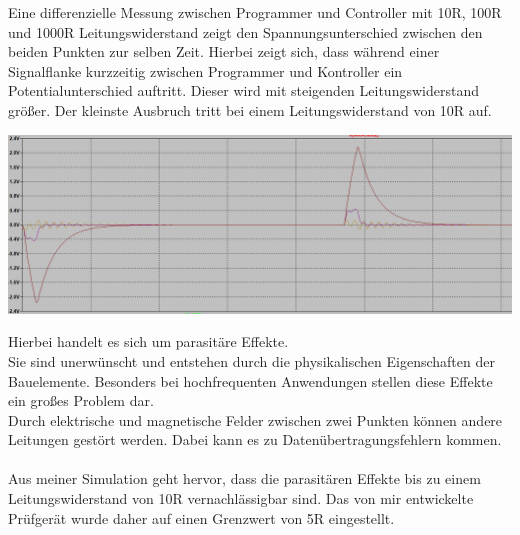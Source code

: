 \newpage

Eine differenzielle Messung zwischen Programmer und Controller mit 10R, 100R und 1000R Leitungswiderstand  zeigt den Spannungsunterschied zwischen den beiden Punkten zur selben Zeit. Hierbei zeigt sich, dass während einer Signalflanke kurzzeitig zwischen Programmer und Kontroller ein Potentialunterschied auftritt. Dieser wird mit steigenden Leitungswiderstand größer. Der kleinste Ausbruch tritt bei einem Leitungswiderstand von 10R auf.


\begin{center}
\includegraphics[width=17cm]{Bilder/LTC-SIGNALVERLAUF2.png}
\end{center}

Hierbei handelt es sich um parasitäre Effekte. 
\\
Sie sind unerwünscht und entstehen durch die physikalischen Eigenschaften der Bauelemente. Besonders bei hochfrequenten Anwendungen stellen diese Effekte ein großes Problem dar.
\\
Durch elektrische und magnetische Felder zwischen zwei Punkten können andere Leitungen gestört werden. Dabei kann es zu Datenübertragungsfehlern kommen.
\\
\\
Aus meiner Simulation geht hervor, dass die parasitären Effekte bis zu einem Leitungswiderstand von 10R vernachlässigbar sind. Das von mir entwickelte Prüfgerät wurde daher auf einen Grenzwert von 5R eingestellt. 
